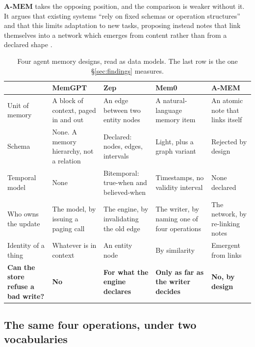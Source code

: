 \documentclass[11pt,a4paper]{article}
\renewcommand{\arraystretch}{1.25}
\newcommand{\lnum}[1]{{\firalining #1}}
\begin{document}
\textbf{A-MEM} takes the opposing position, and the comparison is weaker
without it. It argues that existing systems ``rely on fixed schemas or
operation structures'' and that this limits adaptation to new tasks,
proposing instead notes that link themselves into a network which emerges
from content rather than from a declared shape \cite{amem}.

\begin{table}[!htbp]
\centering
\caption[Four memory designs]{Four agent memory designs, read as data models. The last row is
the one \S\ref{sec:findings} measures.}
\label{tab:designs}
{\scriptsize
\renewcommand{\arraystretch}{1.25}
\begin{tabularx}{\textwidth}{L{2.05cm} Y Y Y Y}
\toprule
 & \sffamily\bfseries MemGPT \cite{memgpt} &
   \sffamily\bfseries Zep \cite{zep} &
   \sffamily\bfseries \lnum{Mem0} \cite{mem0} &
   \sffamily\bfseries A-MEM \cite{amem} \\
\midrule
Unit of memory &
A block of context, paged in and out &
An edge between two entity nodes &
A natural-language memory item &
An atomic note that links itself \\

Schema &
None. A memory hierarchy, not a relation &
Declared: nodes, edges, intervals &
Light, plus a graph variant &
Rejected by design \\

Temporal model &
None &
Bitemporal: true-when and believed-when &
Timestamps, no validity interval &
None declared \\

Who owns the update &
The model, by issuing a paging call &
The engine, by invalidating the old edge &
The writer, by naming one of four operations &
The network, by re-linking notes \\

Identity of a thing &
Whatever is in context &
An entity node &
By similarity &
Emergent from links \\

\midrule
\sffamily\bfseries Can the store refuse a bad write? &
\sffamily\bfseries No &
\sffamily\bfseries For what the engine declares &
\sffamily\bfseries Only as far as the writer decides &
\sffamily\bfseries No, by design \\
\bottomrule
\end{tabularx}}
\end{table}

\subsection{The same four operations, under two vocabularies}
\end{document}
